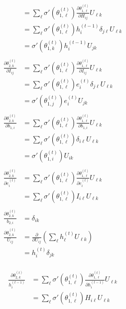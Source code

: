 \documentclass{article}
\begin{document}
\begin{itemize}
    \begin{align*}
        &= \sum_\ell \sigma'(\theta_{1, \ell}^{(t)})\frac{\partial \theta_{1, \ell}^{(t)}}{\partial H_{ij}} U_{\ell k} \\
        &= \sum_\ell \sigma'(\theta_{1, \ell}^{(t)}) h_{i}^{(t-1)}\delta_{j\ell} U_{\ell k} \\
        &= \sigma'(\theta_{1, k}^{(t)}) h_{i}^{(t-1)} U_{j k} \\
        \\
        \frac{\partial \theta_{2,k}^{(t)}}{\partial I_{ij}} &= \sum_\ell \sigma'(\theta_{1, \ell}^{(t)})\frac{\partial \theta_{1, \ell}^{(t)}}{\partial I_{ij}} U_{\ell k} \\
        &= \sum_\ell \sigma'(\theta_{1, \ell}^{(t)}) e_i^{(t)}\delta_{j\ell} U_{\ell k} \\
        &= \sigma'(\theta_{1, j}^{(t)}) e_i^{(t)} U_{j k} \\
        \\
        \frac{\partial \theta_{2,k}^{(t)}}{\partial b_{1,i}} &= \sum_\ell \sigma'(\theta_{1, \ell}^{(t)})\frac{\partial \theta_{1, \ell}^{(t)}}{\partial b_{1,i}} U_{\ell k} \\
        &= \sum_\ell \sigma'(\theta_{1, \ell}^{(t)}) \delta_{i\ell} U_{\ell k} \\
        &= \sigma'(\theta_{1, i}^{(t)}) U_{i k} \\
        \\
        \frac{\partial \theta_{2,k}^{(t)}}{\partial e_i^{(t)}} &= \sum_\ell \sigma'(\theta_{1, \ell}^{(t)})\frac{\partial \theta_{1, \ell}^{(t)}}{\partial e_i^{(t)}} U_{\ell k}\\
        &= \sum_\ell \sigma'(\theta_{1, \ell}^{(t)}) I_{i \ell} U_{\ell k}\\
        \\
        \frac{\partial \theta_{2,k}^{(t)}}{b_{2,i}} &= \delta_{ik}
        \\
        \frac{\partial \theta_{2,k}^{(t)}}{U_{ij}} &= \frac{\partial}{\partial U_{ij}} \left( \sum_\ell h_\ell^{(t)}U_{\ell k} \right) \\
        &= h_i^{(t)}\delta_{jk}\\
    \end{align*}
    
    \begin{align*}
        \frac{\partial \theta_{2,k}^{(t)}}{h_i^{(t-1)}} &= \sum_\ell \sigma'(\theta_{1, \ell}^{(t)})\frac{\partial \theta_{1, \ell}^{(t)}}{\partial h_i^{(t-1)}} U_{\ell k} \\
        &= \sum_\ell \sigma'(\theta_{1, \ell}^{(t)}) H_{i\ell} U_{\ell k}
    \end{align*}
    

\end{itemize}
\end{document}
